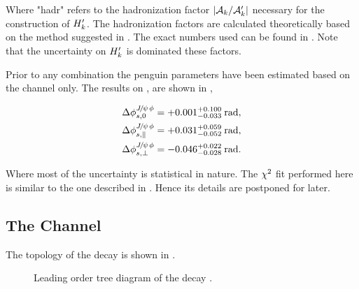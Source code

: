 \noindent Where "hadr" refers to the hadronization factor $|\mathcal{A}_{k}/\mathcal{A}_{k}'|$ necessary for the construction of $H_{k}'$.
The hadronization factors are calculated theoretically based on the method suggested in \cite{eff-hamiltonian-bs-syst}.
The exact numbers used can be found in \cite{DeBruyn-thesis}. Note that the uncertainty on $H_{k}'$ is dominated these factors.


Prior to any combination the penguin parameters have been estimated based on the \BsJpsiKst channel only.
The results on \cite{bsjpsikst-paper}, are shown in ,

\begin{subequations}
  \label{delta_phis_jpsikst}
  \begin{align}
    \Delta\phi^{{J\mskip -3mu/\mskip -2mu\psi\mskip 2mu}\phi}_{s,{0}}         & = +0.001^{+0.100}_{-0.033} \:\text{rad},\\
    \Delta\phi^{{J\mskip -3mu/\mskip -2mu\psi\mskip 2mu}\phi}_{s,{\parallel}} & = +0.031^{+0.059}_{-0.052} \:\text{rad},\\
    \Delta\phi^{{J\mskip -3mu/\mskip -2mu\psi\mskip 2mu}\phi}_{s,{\perp}}     & = -0.046^{+0.022}_{-0.028} \:\text{rad}.
  \end{align}
\end{subequations}

\noindent Where most of the uncertainty is statistical in nature. The $\chi^2$ fit performed here is similar
to the one described in . Hence its details are postponed for later.


\subsection{The \BdJpsiRho Channel}
\label{bsjpsirho_chanell}

The topology of the \BdJpsiRho decay is shown in .

\begin{figure}[h]
  \centering
  \scalebox{0.9}{\sffamily }
  \caption{Leading order tree diagram of the decay \BdJpsiRho.}
  \label{bs2jpsirho_diagram}
\end{figure}

